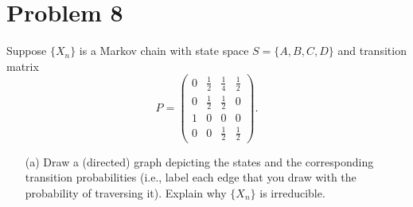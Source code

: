 \documentclass[11pt]{article}
\begin{document}
\section*{Problem 8}
\begin{problem}
    Suppose \( \{X_n\} \) is a Markov chain with state space \( S = \{A, B, C, D\} \) and transition matrix
\[
P = \begin{pmatrix}
0 & \frac{1}{2} & \frac{1}{4} & \frac{1}{2} \\
0 & \frac{1}{2} & \frac{1}{2} & 0 \\
1 & 0 & 0 & 0 \\
0 & 0 & \frac{1}{2} & \frac{1}{2}
\end{pmatrix}.
\]

\begin{enumerate}
    \item[(a)] Draw a (directed) graph depicting the states and the corresponding transition probabilities (i.e., label each edge that you draw with the probability of traversing it). Explain why \( \{X_n\} \) is irreducible.
    \begin{solution}
        \begin{center}
\end{center}
\end{solution}
\end{enumerate}
\end{problem}
\end{document}
